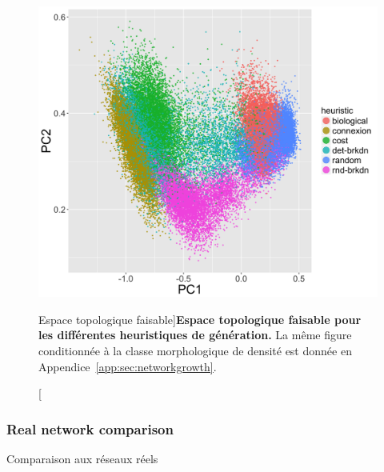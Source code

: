 \begin{figure}
\includegraphics[width=\linewidth]{Figures/NetworkGrowth/feasible_space_pca}
\caption[][Espace topologique faisable]{}{\textbf{Espace topologique faisable pour les différentes heuristiques de génération.} La même figure conditionnée à la classe morphologique de densité est donnée en Appendice~\ref{app:sec:networkgrowth}.\label{fig:networkgrowth:feasiblespace}}
\end{figure}

%



\subsubsection{Real network comparison}{Comparaison aux réseaux réels}







